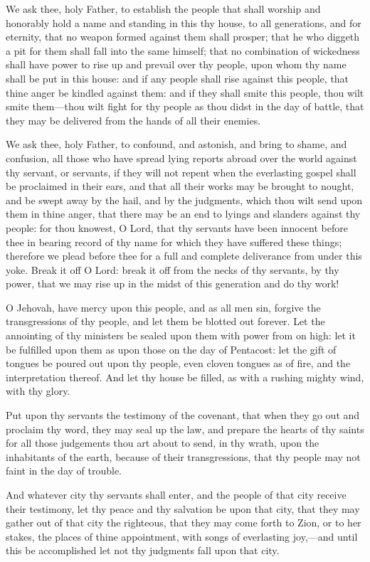 					We ask thee, holy Father, to establish the people that shall worship and honorably hold a name and standing in this thy house, to all generations, and for eternity, that no weapon formed against them shall prosper; that he who diggeth a pit for them shall fall into the same himself; that no combination of wickedness shall have power to rise up and prevail over thy people, upon whom thy name shall be put in this house: and if any people shall rise against this people, that thine anger be kindled against them: and if they shall smite this people, thou wilt smite them---thou wilt fight for thy people as thou didst in the day of battle, that they may be delivered from the hands of all their enemies.

					We ask thee, holy Father, to confound, and astonish, and bring to shame, and confusion, all those who have spread lying reports abroad over the world against thy servant, or servants, if they will not repent when the everlasting gospel shall be proclaimed in their ears, and that all their works may be brought to nought, and be swept away by the hail, and by the judgments, which thou wilt send upon them in thine anger, that there may be an end to lyings and slanders against thy people: for thou knowest, O Lord, that thy servants have been innocent before thee in bearing record of thy name for which they have suffered these things; therefore we plead before thee for a full and complete deliverance from under this yoke. Break it off O Lord: break it off from the necks of thy servants, by thy power, that we may rise up in the midst of this generation and do thy work!

					O Jehovah, have mercy upon this people, and as all men sin, forgive the transgressions of thy people, and let them be blotted out forever. Let the annointing of thy ministers be sealed upon them with power from on high: let it be fulfilled upon them as upon those on the day of Pentacost: let the gift of tongues be poured out upon thy people, even cloven tongues as of fire, and the interpretation thereof. And let thy house be filled, as with a rushing mighty wind, with thy glory.

					Put upon thy servants the testimony of the covenant, that when they go out and proclaim thy word, they may seal up the law, and prepare the hearts of thy saints for all those judgements thou art about to send, in thy wrath, upon the inhabitants of the earth, because of their transgressions, that thy people may not faint in the day of trouble.

					And whatever city thy servants shall enter, and the people of that city receive their testimony, let thy peace and thy salvation be upon that city, that they may gather out of that city the righteous, that they may come forth to Zion, or to her stakes, the places of thine appointment, with songs of everlasting joy,---and until this be accomplished let not thy judgments fall upon that city.

